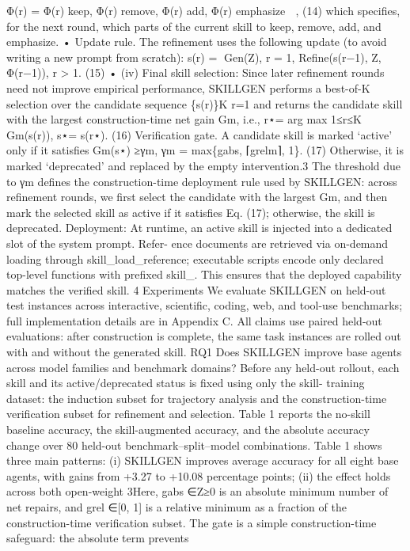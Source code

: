 Φ(r) =
 Φ(r)
keep, Φ(r)
remove, Φ(r)
add, Φ(r)
emphasize

,
(14)
which specifies, for the next round, which parts of the current skill to keep, remove, add, and
emphasize. • Update rule. The refinement uses the following update (to avoid writing a new prompt
from scratch):
s(r) =
Gen(Z),
r = 1,
Refine(s(r−1), Z, Φ(r−1)),
r > 1.
(15)
• (iv) Final skill selection: Since later refinement rounds need not improve empirical performance,
SKILLGEN performs a best-of-K selection over the candidate sequence \{s(r)\}K
r=1 and returns the
candidate skill with the largest construction-time net gain Gm, i.e.,
r⋆= arg max
1≤r≤K
Gm(s(r)),
s⋆= s(r⋆).
(16)
Verification gate. A candidate skill is marked ‘active’ only if it satisfies
Gm(s⋆) ≥γm,
γm = max\{gabs, ⌈grelm⌉, 1\}.
(17)
Otherwise, it is marked ‘deprecated’ and replaced by the empty intervention.3 The threshold due to
γm defines the construction-time deployment rule used by SKILLGEN: across refinement rounds, we
first select the candidate with the largest Gm, and then mark the selected skill as active if it satisfies
Eq. (17); otherwise, the skill is deprecated.
Deployment: At runtime, an active skill is injected into a dedicated slot of the system prompt. Refer-
ence documents are retrieved via on-demand loading through skill\_load\_reference; executable
scripts encode only declared top-level functions with prefixed skill\_. This ensures that the deployed
capability matches the verified skill.
4
Experiments
We evaluate SKILLGEN on held-out test instances across interactive, scientific, coding, web, and
tool-use benchmarks; full implementation details are in Appendix C. All claims use paired held-out
evaluations: after construction is complete, the same task instances are rolled out with and without
the generated skill.
RQ1 Does SKILLGEN improve base agents across model families and benchmark domains?
Before any held-out rollout, each skill and its active/deprecated status is fixed using only the skill-
training dataset: the induction subset for trajectory analysis and the construction-time verification
subset for refinement and selection. Table 1 reports the no-skill baseline accuracy, the skill-augmented
accuracy, and the absolute accuracy change over 80 held-out benchmark–split–model combinations.
Table 1 shows three main patterns: (i) SKILLGEN improves average accuracy for all eight base agents,
with gains from +3.27 to +10.08 percentage points; (ii) the effect holds across both open-weight
3Here, gabs ∈Z≥0 is an absolute minimum number of net repairs, and grel ∈[0, 1] is a relative minimum as a fraction
of the construction-time verification subset. The gate is a simple construction-time safeguard: the absolute term prevents
